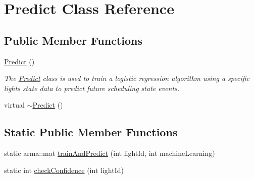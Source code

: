 \hypertarget{class_predict}{}\section{Predict Class Reference}
\label{class_predict}
\subsection*{Public Member Functions}
\begin{DoxyCompactItemize}
\item 
\hyperlink{class_predict_af917672f59888068ae9d3f0a211e0672}{Predict} ()
\begin{DoxyCompactList}\small\item\em The \hyperlink{class_predict}{Predict} class is used to train a logistic regression algorithm using a specific lights state data to predict future scheduling state events. \end{DoxyCompactList}\item 
virtual \hyperlink{class_predict_a735a7ad53f62ecbe74d25ba56aa893fe}{$\sim$\+Predict} ()
\end{DoxyCompactItemize}
\subsection*{Static Public Member Functions}
\begin{DoxyCompactItemize}
\item 
static arma\+::mat \hyperlink{class_predict_a21136d6e19dd267fbbd2b1ba672ad043}{train\+And\+Predict} (int light\+Id, int machine\+Learning)
\item 
static int \hyperlink{class_predict_a7b1ff9116156ce5bf0fb3b366833e2da}{check\+Confidence} (int light\+Id)
\end{DoxyCompactItemize}
